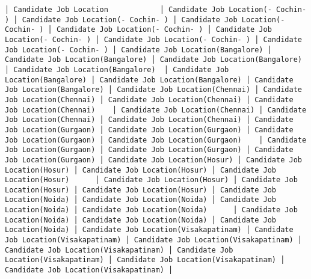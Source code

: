 \documentclass[11pt]{article}
\begin{document}
\begin{Verbatim}[commandchars=\\\{\}]
│ Candidate Job Location            │ Candidate Job Location(- Cochin- ) │ Candidate Job Location(- Cochin- ) │ Candidate Job Location(- Cochin- ) │ Candidate Job Location(- Cochin- ) │ Candidate Job Location(- Cochin- ) │ Candidate Job Location(- Cochin- ) │ Candidate Job Location(- Cochin- ) │ Candidate Job Location(Bangalore) │ Candidate Job Location(Bangalore) │ Candidate Job Location(Bangalore) │ Candidate Job Location(Bangalore)  │ Candidate Job Location(Bangalore) │ Candidate Job Location(Bangalore) │ Candidate Job Location(Bangalore) │ Candidate Job Location(Chennai) │ Candidate Job Location(Chennai) │ Candidate Job Location(Chennai) │ Candidate Job Location(Chennai)    │ Candidate Job Location(Chennai) │ Candidate Job Location(Chennai) │ Candidate Job Location(Chennai) │ Candidate Job Location(Gurgaon) │ Candidate Job Location(Gurgaon) │ Candidate Job Location(Gurgaon) │ Candidate Job Location(Gurgaon)    │ Candidate Job Location(Gurgaon) │ Candidate Job Location(Gurgaon) │ Candidate Job Location(Gurgaon) │ Candidate Job Location(Hosur) │ Candidate Job Location(Hosur) │ Candidate Job Location(Hosur) │ Candidate Job Location(Hosur)      │ Candidate Job Location(Hosur) │ Candidate Job Location(Hosur) │ Candidate Job Location(Hosur) │ Candidate Job Location(Noida) │ Candidate Job Location(Noida) │ Candidate Job Location(Noida) │ Candidate Job Location(Noida)      │ Candidate Job Location(Noida) │ Candidate Job Location(Noida) │ Candidate Job Location(Noida) │ Candidate Job Location(Visakapatinam) │ Candidate Job Location(Visakapatinam) │ Candidate Job Location(Visakapatinam) │ Candidate Job Location(Visakapatinam) │ Candidate Job Location(Visakapatinam) │ Candidate Job Location(Visakapatinam) │ Candidate Job Location(Visakapatinam) │

\end{Verbatim}
\end{document}
